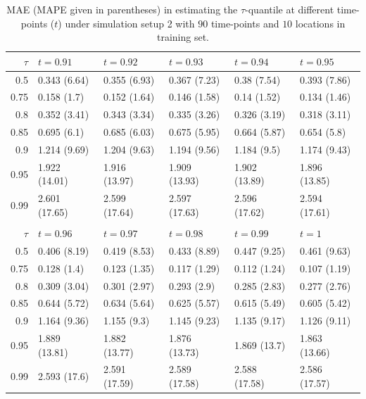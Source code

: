 \documentclass[aos]{imsart}
\theoremstyle{plain}
\theoremstyle{remark}
\begin{document}
\begin{table}[ht]
\centering
\caption{MAE (MAPE given in parentheses) in estimating the $\tau$-quantile at different time-points ($t$) under simulation setup 2 with $90$ time-points and $10$ locations in training set.}
\label{tab:sim-S2-MAE-pred}
\begin{tabular}{rlllll}
  \hline
 $\tau$ & $t = 0.91$ & $t = 0.92$ & $t = 0.93$ & $t = 0.94$ & $t = 0.95$ \\ 
  \hline
    0.5 & 0.343 (6.64) & 0.355 (6.93) & 0.367 (7.23) & 0.38 (7.54) & 0.393 (7.86)  \\ 
  0.75 & 0.158 (1.7) & 0.152 (1.64) & 0.146 (1.58) & 0.14 (1.52) & 0.134 (1.46)  \\ 
  0.8 & 0.352 (3.41) & 0.343 (3.34) & 0.335 (3.26) & 0.326 (3.19) & 0.318 (3.11)  \\ 
  0.85 & 0.695 (6.1) & 0.685 (6.03) & 0.675 (5.95) & 0.664 (5.87) & 0.654 (5.8) \\ 
  0.9 & 1.214 (9.69) & 1.204 (9.63) & 1.194 (9.56) & 1.184 (9.5) & 1.174 (9.43) \\ 
  0.95 & 1.922 (14.01) & 1.916 (13.97) & 1.909 (13.93) & 1.902 (13.89) & 1.896 (13.85) \\ 
  0.99 & 2.601 (17.65) & 2.599 (17.64) & 2.597 (17.63) & 2.596 (17.62) & 2.594 (17.61)  \\ 
  & & & & & \\
   \hline
   $\tau$ & $t = 0.96$ & $t = 0.97$ & $t = 0.98$ & $t = 0.99$ & $t = 1$ \\ 
  \hline
    0.5 & 0.406 (8.19) & 0.419 (8.53) & 0.433 (8.89) & 0.447 (9.25) & 0.461 (9.63) \\ 
  0.75 &  0.128 (1.4) & 0.123 (1.35) & 0.117 (1.29) & 0.112 (1.24) & 0.107 (1.19) \\ 
  0.8 &  0.309 (3.04) & 0.301 (2.97) & 0.293 (2.9) & 0.285 (2.83) & 0.277 (2.76) \\ 
  0.85 &  0.644 (5.72) & 0.634 (5.64) & 0.625 (5.57) & 0.615 (5.49) & 0.605 (5.42) \\ 
  0.9 &  1.164 (9.36) & 1.155 (9.3) & 1.145 (9.23) & 1.135 (9.17) & 1.126 (9.11) \\ 
  0.95 &  1.889 (13.81) & 1.882 (13.77) & 1.876 (13.73) & 1.869 (13.7) & 1.863 (13.66) \\ 
  0.99 &  2.593 (17.6) & 2.591 (17.59) & 2.589 (17.58) & 2.588 (17.58) & 2.586 (17.57) \\ 
  \hline
\end{tabular}
\end{table}
\end{document}
